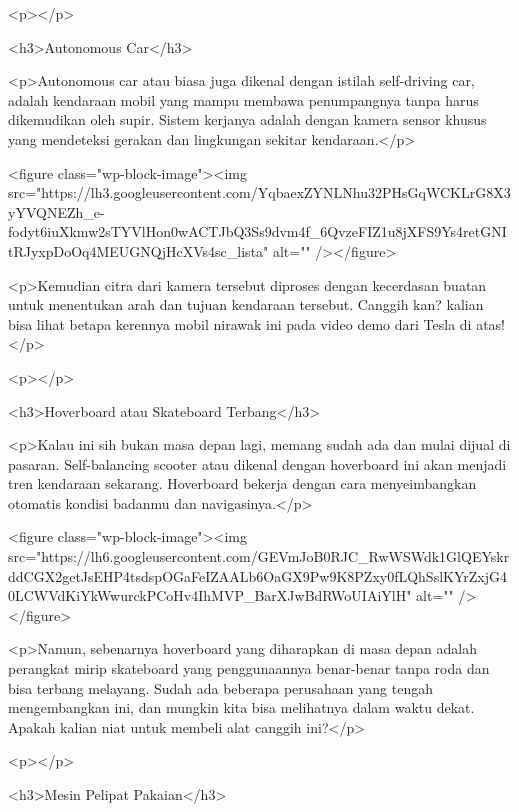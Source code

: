 <p></p>



<h3>Autonomous Car</h3>



<p>Autonomous car atau biasa juga dikenal dengan istilah self-driving car, adalah kendaraan mobil yang mampu membawa penumpangnya tanpa harus dikemudikan oleh supir. Sistem kerjanya adalah dengan kamera sensor khusus yang mendeteksi gerakan dan lingkungan sekitar kendaraan.</p>



<figure class="wp-block-image"><img src="https://lh3.googleusercontent.com/YqbaexZYNLNhu32PHsGqWCKLrG8X3yYVQNEZh_e-fodyt6iuXkmw2sTYVlHon0wACTJbQ3Ss9dvm4f_6QvzeFIZ1u8jXFS9Ys4retGNItRJyxpDoOq4MEUGNQjHcXVs4sc_lista" alt="" /></figure>



<p>Kemudian citra dari kamera tersebut diproses dengan kecerdasan buatan untuk menentukan arah dan tujuan kendaraan tersebut. Canggih kan? kalian bisa lihat betapa kerennya mobil nirawak ini pada video demo dari Tesla di atas!</p>



<p></p>



<h3>Hoverboard atau Skateboard Terbang</h3>



<p>Kalau ini sih bukan masa depan lagi, memang sudah ada dan mulai dijual di pasaran. Self-balancing scooter atau dikenal dengan hoverboard ini akan menjadi tren kendaraan sekarang. Hoverboard bekerja dengan cara menyeimbangkan otomatis kondisi badanmu dan navigasinya.</p>



<figure class="wp-block-image"><img src="https://lh6.googleusercontent.com/GEVmJoB0RJC_RwWSWdk1GlQEYskrddCGX2getJsEHP4tsdspOGaFeIZAALb6OaGX9Pw9K8PZxy0fLQhSslKYrZxjG40LCWVdKiYkWwurckPCoHv4IhMVP_BarXJwBdRWoUIAiYlH" alt="" /></figure>



<p>Namun, sebenarnya hoverboard yang diharapkan di masa depan adalah perangkat mirip skateboard yang penggunaannya benar-benar tanpa roda dan bisa terbang melayang. Sudah ada beberapa perusahaan yang tengah mengembangkan ini, dan mungkin kita bisa melihatnya dalam waktu dekat. Apakah kalian niat untuk membeli alat canggih ini?</p>



<p></p>



<h3>Mesin Pelipat Pakaian</h3>



